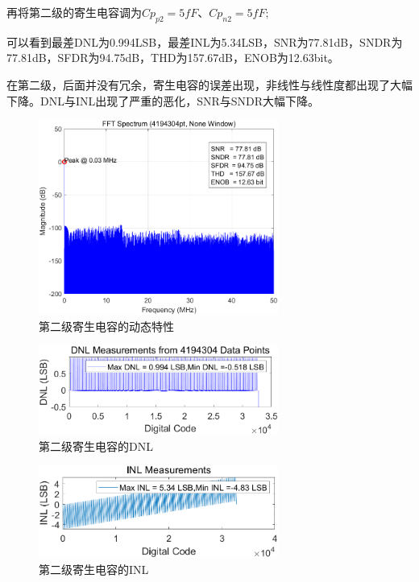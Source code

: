 \documentclass[cs4size,a4paper]{ctexart}
\numberwithin{equation}{section}
\numberwithin{table}{section}
\numberwithin{figure}{section}
\begin{document}
\begin{itemize}
		再将第二级的寄生电容调为$Cp_{p2}  = 5fF $、$ Cp_{n2} = 5fF;$
		
		可以看到最差DNL为0.994LSB，最差INL为5.34LSB，SNR为77.81dB，SNDR为77.81dB，SFDR为94.75dB，THD为157.67dB，ENOB为12.63bit。
		
		在第二级，后面并没有冗余，寄生电容的误差出现，非线性与线性度都出现了大幅下降。DNL与INL出现了严重的恶化，SNR与SNDR大幅下降。
		\begin{figure}[H]
			\centering
			\includegraphics[width=0.7\textwidth]{pic/Co/DFT2.png}
			\caption{第二级寄生电容的动态特性}
		\end{figure}

		\begin{figure}[H]
			\centering
			\includegraphics[width=0.7\textwidth]{pic/Co/DNL2.png}
			\caption{第二级寄生电容的DNL}
		\end{figure}

		\begin{figure}[H]
			\centering
			\includegraphics[width=0.7\textwidth]{pic/Co/INL2.png}
			\caption{第二级寄生电容的INL}
		\end{figure}


\end{itemize}
\end{document}
